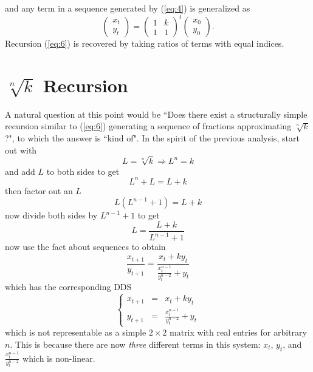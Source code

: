 \documentclass[11pt]{article}
\theoremstyle{plain}
\theoremstyle{definition}
\begin{document}
and any term in a sequence generated by (\ref{eq:4}) is generalized as
\begin{equation}\label{eq:5}
\left(\begin{array}{c}
x_t \\
y_t\end{array}\right)
={\left(\begin{array}{cc}
1 & k \\
1 & 1\end{array}\right)}^t
\left(\begin{array}{c}
x_0 \\
y_0\end{array}\right).
\end{equation}
Recursion (\ref{eq:6}) is recovered by taking ratios of terms with equal indices.

\section{$\sqrt[n]{k}$ Recursion}
A natural question at this point would be ``Does there exist a structurally simple recursion similar to (\ref{eq:6}) generating a sequence of fractions approximating $\sqrt[n]{k}$ ?", to which the answer is ``kind of". In the spirit of the previous analysis, start out with $$L=\sqrt[n]{k}\Rightarrow L^n=k$$ and add $L$ to both sides to get $$L^n + L = L+k$$ then factor out an $L$ $$L(L^{n-1}+1)=L+k$$ now divide both sides by $L^{n-1}+1$ to get $$L=\frac{L+k}{L^{n-1}+1}$$ now use the fact about sequences to obtain
\begin{equation}\label{eq:7}
\frac{x_{t+1}}{y_{t+1}}=\frac{x_t + k y_t}{\frac{x^{n-1}_t}{y^{n-2}_t} + y_t}
\end{equation} which has the corresponding DDS
\begin{equation}\label{eq:8}
\left\{\begin{array}{ccc}
x_{t+1} & = & x_t+k y_t \\
y_{t+1} & = & \frac{x_t^{n-1}}{y_t^{n-2}} + y_t\end{array}\right.
\end{equation} which is not representable as a simple $2\times 2$ matrix with real entries for arbitrary $n$. This is because there are now \emph{three} different terms in this system: $x_t$, $y_t$, and $\frac{x_t^{n-1}}{y_t^{n-2}}$ which is non-linear.
\end{document}
